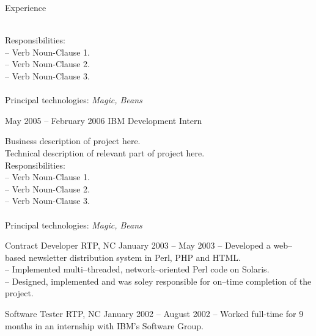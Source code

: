 \documentclass[letterpaper, 11pt]{article}
\begin{document}
\begin{resume}
\begin{category}{Experience}
\begin{block}
                \\[1ex]
                Responsibilities: \\
                -- Verb Noun-Clause 1. \\
                -- Verb Noun-Clause 2. \\
                -- Verb Noun-Clause 3. \\
                \\[1ex]
                Principal technologies: \emph{ Magic, Beans }
            \end{block}
            \begin{block}
                 {May 2005 -- February 2006}
                         {IBM}                         {Development Intern}
                \par
                Business description of project here.
                \\[1ex]
                Technical description of relevant part of project here.
                \\[1ex]
                Responsibilities: \\
                -- Verb Noun-Clause 1. \\
                -- Verb Noun-Clause 2. \\
                -- Verb Noun-Clause 3. \\
                \\[1ex]
                Principal technologies: \emph{ Magic, Beans }
            \end{block}
            \begin{block}
                 {Contract Developer}
                         {RTP, NC}        {January 2003 -- May 2003}
                -- Developed a web--based newsletter distribution system in Perl, PHP and HTML.            \\
                -- Implemented multi--threaded, network--oriented Perl code on Solaris.                    \\
                -- Designed, implemented and was soley responsible for on--time completion of the project.
            \end{block}
            \begin{block}
                                      {Software Tester}
                         {RTP, NC}                  {January 2002 -- August 2002}
                -- Worked full-time for 9 months in an internship with IBM's Software Group.            \\

\end{block}
\end{category}
\end{resume}
\end{document}
